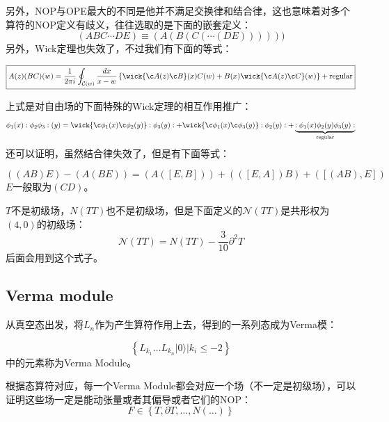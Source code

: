 另外，NOP与OPE最大的不同是他并不满足交换律和结合律，这也意味着对多个算符的NOP定义有歧义，往往选取的是下面的嵌套定义：
\begin{equation}
	(ABC\cdots DE)\equiv(A(B(C(\cdots(DE))))))
\end{equation}
另外，Wick定理也失效了，不过我们有下面的等式：
\begin{theorem}
	\begin{equation}\label{wick}
		\boxed{
			{A(z)(BC)}(w)=\frac1{2\pi i}\oint_{\mathcal{C}(w)}\frac{dx}{x-w}\left\{\wick{\c A(z)\c B}(x)C(w)+B(x)\wick{\c A(z)\c C}(w)\right\}+\text{regular}
		}
	\end{equation}
\end{theorem}
上式是对自由场的下面特殊的Wick定理的相互作用推广：
\begin{equation}
	\phi_1(x):\phi_2\phi_3:(y)=\wick{\c\phi_1(x)\c\phi_2(y)}:\phi_3(y):+\wick{\c\phi_1(x)\c\phi_3(y)}:\phi_2(y):+\underbrace{:\phi_1(x)\phi_2(y)\phi_3(y):}_{\text{regular}}
\end{equation}
还可以证明，虽然结合律失效了，但是有下面等式：
\begin{theorem}
	\begin{equation}
		((AB)E)-(A(BE))=(A([E,B]))+(([E,A])B)+([(AB),E])
	\end{equation}
	$E$一般取为$(CD)$。
\end{theorem}
$T$不是初级场，$N(TT)$也不是初级场，但是下面定义的$\mathcal{N}(TT)$是共形权为$(4,0)$的初级场：
\begin{equation}
	\boxed{
		\mathcal{N}(TT)=N\left(TT\right)-\frac3{10}\partial^2T
	}
\end{equation}
后面会用到这个式子。
\subsection{Verma module}
从真空态出发，将$L_n$作为产生算符作用上去，得到的一系列态成为Verma模：
\begin{definition}
	\begin{equation}
		\boxed{
			\left\{L_{k_1}\ldots L_{k_n}|0\rangle|k_i\leq-2\right\}
		}
	\end{equation}
	中的元素称为Verma Module。
\end{definition}
根据态算符对应，每一个Verma Module都会对应一个场（不一定是初级场），可以证明这些场一定是能动张量或者其偏导或者它们的NOP：
\begin{equation}
	\boxed{
		F\in\left\{T,\partial T,\ldots,N(\ldots)\right\}
	}
\end{equation}
